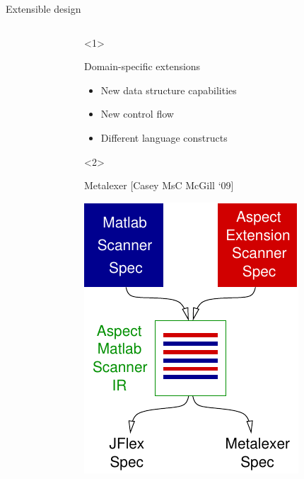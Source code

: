 \begin{frame}[t]{Extensible design}
\begin{columns}[T]
\begin{column}{5cm}
    \end{column}
    \begin{column}{5cm}
      \begin{onlyenv}<1>
        \begin{block}{Domain-specific extensions}
          \begin{itemize}
          \item New data structure capabilities
          \item New control flow
          \item Different language constructs
          \end{itemize}
        \end{block}
      \end{onlyenv}
      \begin{onlyenv}<2>
        \begin{block}{Metalexer {\tiny[Casey MsC McGill `09]}
          \vspace{1ex}}
          \begin{center}
            \includegraphics[scale=0.7]{images/metalexer.pdf}
          \end{center}


\end{block}
\end{onlyenv}
\end{column}
\end{columns}
\end{frame}
